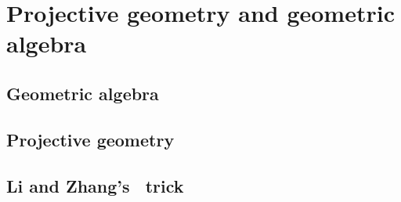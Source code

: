 \section{Projective geometry and geometric algebra}
\label{ch:background}

\subsection{Geometric algebra}
\label{sec:intro-ga}

\subsection{Projective geometry}
\label{sec:projective}

\subsection{Li and Zhang's~\cite{Hongbo} trick}
\label{sec:hongbo}
